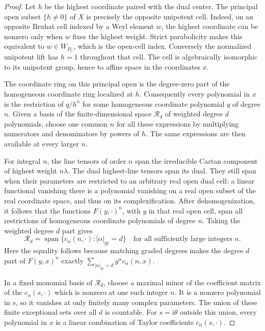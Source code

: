 \begin{proof}
Let $h$ be the highest coordinate paired with the dual center.  The
principal open subset $\{h\ne0\}$ of $X$ is precisely the opposite
unipotent cell.  Indeed, on an opposite Bruhat cell indexed by a Weyl
element $w$, the highest coordinate can be nonzero only when $w$
fixes the highest weight.  Strict parabolicity makes this equivalent
to $w\in W_{P_{\mathbb C}}$, which is the open-cell index.  Conversely
the normalized unipotent lift has $h=1$ throughout that cell.
The cell is algebraically isomorphic to its unipotent group, hence
to affine space in the coordinates $x$.

The coordinate ring on this principal open is the degree-zero part
of the homogeneous coordinate ring localized at $h$.  Consequently
every polynomial in $x$ is the restriction of $q/h^n$ for some
homogeneous coordinate polynomial $q$ of degree $n$.  Given a basis
of the finite-dimensional space $\mathcal R_d$ of weighted degree
$d$ polynomials, choose one common $n$ for all these expressions by
multiplying numerators and denominators by powers of $h$.
The same expressions are then available at every larger $n$.

For integral $n$, the line tensors of order $n$ span the irreducible
Cartan component of highest weight $n\lambda$.  The dual highest-line
tensors span its dual.  They still span when their parameters are
restricted to an arbitrary real open dual cell: a linear functional
vanishing there is a polynomial vanishing on a real open subset of
the real coordinate space, and thus on its complexification.
After dehomogenization, it follows that the functions
$F(y,\cdot)^n$, with $y$ in that real open cell, span all restrictions
of homogeneous coordinate polynomials of degree $n$.  Taking the
weighted degree $d$ part gives
\[
 \mathcal R_d
   =\operatorname{span}\{c_\alpha(n,\cdot):
                                      |\alpha|_{\mathrm{gr}}=d\}
 \quad\text{for all sufficiently large integers }n.
\]
Here the equality follows because matching graded degrees makes the
degree $d$ part of $F(y,x)^n$ exactly
$\sum_{|\alpha|_{\mathrm{gr}}=d}y^\alpha c_\alpha(n,x)$.

In a fixed monomial basis of $\mathcal R_d$, choose a maximal minor
of the coefficient matrix of the $c_\alpha(s,\cdot)$ which is
nonzero at one such integer $n$.  It is a nonzero polynomial in
$s$, so it vanishes at only finitely many complex parameters.
The union of these finite exceptional sets over all $d$ is
countable.  For $s=\mathrm i\theta$ outside this union, every
polynomial in $x$ is a linear combination of Taylor coefficients
$c_\alpha(s,\cdot)$.


\end{proof}
